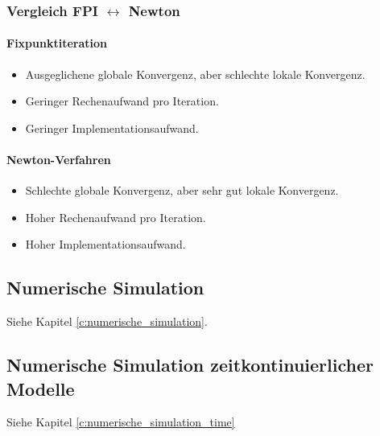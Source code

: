 \documentclass[a4paper, 11pt, accentcolor = tud3b]{tudreport}
\begin{document}
                \subsubsection{Vergleich FPI \( \leftrightarrow \) Newton} %
	                \paragraph{Fixpunktiteration}
		                \begin{itemize}
		                	\item Ausgeglichene globale Konvergenz, aber schlechte lokale Konvergenz.
		                	\item Geringer Rechenaufwand pro Iteration.
		                	\item Geringer Implementationsaufwand.
		                \end{itemize}
	                
	                \paragraph{Newton-Verfahren}
		                \begin{itemize}
		                	\item Schlechte globale Konvergenz, aber sehr gut lokale Konvergenz.
		                	\item Hoher Rechenaufwand pro Iteration.
		                	\item Hoher Implementationsaufwand.
		                \end{itemize}

		        \subsection{Numerische Simulation} %
			        Siehe Kapitel \ref{c:numerische_simulation}.
		        
		        \subsection{Numerische Simulation zeitkontinuierlicher Modelle} %
			        Siehe Kapitel \ref{c:numerische_simulation_time}
\end{document}
